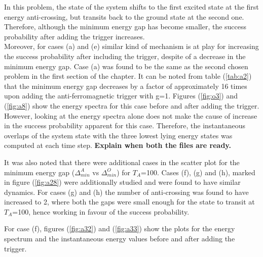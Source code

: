 \documentclass[../main.tex]{subfiles}
\begin{document}
In this problem, the state of the system shifts to the first excited state at the first energy anti-crossing, but transits back to the ground state at the second one. Therefore, although the minimum energy gap has become smaller, the success probability after adding the trigger increases.\\

Moreover, for cases (a) and (e) similar kind of mechanism is at play for increasing the success probability after including the trigger, despite of a decrease in the minimum energy gap. Case (a) was found to be the same as the second chosen problem in the first section of the chapter. It can be noted from table (\ref{tab:a2}) that the minimum energy gap decreases by a factor of approximately 16 times upon adding the anti-ferromagnetic trigger with g=1. Figures (\ref{fig:o3}) and (\ref{fig:a8}) show the energy spectra for this case before and after adding the trigger. However, looking at the energy spectra alone does not make the cause of increase in the success probability apparent for this case. Therefore, the instantaneous overlaps of the system state with the three lowest lying energy states was computed at each time step. \textbf{Explain when both the files are ready.}

It was also noted that there were additional cases in the scatter plot for the minimum energy gap ($\Delta_{min}^A$ vs $\Delta_{min}^O$) for $T_A$=100. Cases (f), (g) and (h), marked in figure (\ref{fig:a28}) were additionally studied and were found to have similar dynamics. For cases (g) and (h) the number of anti-crossing was found to have increased to 2, where both the gaps were small enough for the state to transit at $T_A$=100, hence working in favour of the success probability. 

For case (f), figures (\ref{fig:a32}) and (\ref{fig:a33}) show the plots for the energy spectrum and the instantaneous energy values before and after adding the trigger.
\end{document}
